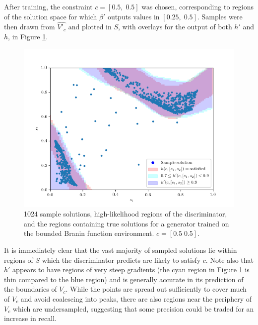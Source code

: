 \documentclass[../../main.tex]{subfiles}
\begin{document}
After training, the constraint $c=[0.5,\;0.5]$ was chosen, corresponding to regions of the solution space for which $\beta'$ outputs values in $[0.25,\;0.5]$.
Samples were then drawn from $\hat{V'_c}$ and plotted in $S$, with overlays for the output of both $h'$ and $h$, in Figure \ref{fig:equality05}.
\begin{figure}[H]
    \begin{center}
    \includegraphics[width=\textwidth]{equality05}
    \caption[Samples from a general Branin constraint]{
        1024 sample solutions, high-likelihood regions of the discriminator, and the regions containing true solutions for a generator trained on the bounded Branin function environment.
        $c=[0.5\;0.5]$.
    }
    \label{fig:equality05}
    \end{center}
\end{figure}
It is immediately clear that the vast majority of sampled solutions lie within regions of $S$ which the discriminator predicts are likely to satisfy $c$.
Note also that $h'$ appears to have regions of very steep gradients (the cyan region in Figure \ref{fig:equality05} is thin compared to the blue region) and is generally accurate in its prediction of the boundaries of $V_c$.
While the points are spread out sufficiently to cover much of $V_c$ and avoid coalescing into peaks, there are also regions near the periphery of $V_c$ which are undersampled, suggesting that some precision could be traded for an increase in recall.
\end{document}

